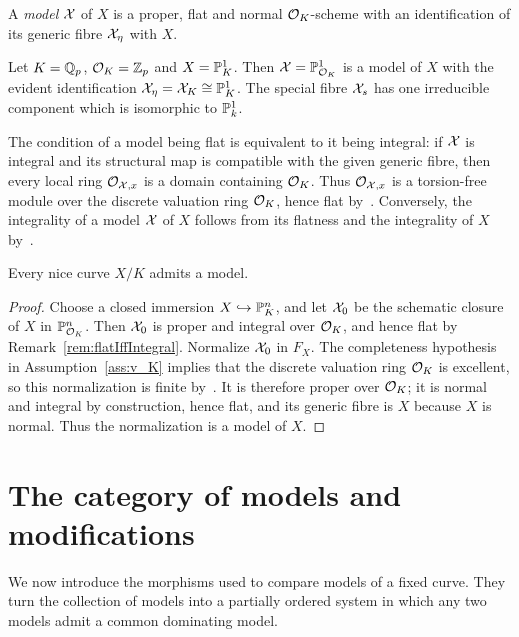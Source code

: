 \begin{definition} \label{def:model}
    A \textit{model} $\mathcal X$ of $X$ is a proper, flat and normal $\mathcal O_K $-scheme
    with an identification of its generic fibre $\mathcal X_\eta$ with $X$.
\end{definition}


\begin{example}
    Let $K = \mathbb Q_p$, $\mathcal O_K  = \mathbb Z_p$ and $X = \mathbb P^1_K$.
    Then $\mathcal X = \mathbb P^1_{\mathcal O_K}$ is a model of $X$ with the evident identification
    $\mathcal X_\eta = \mathcal X_K \cong \mathbb P^1_K$.
    The special fibre $\mathcal X_s$ has one irreducible component which is isomorphic to $\mathbb P^1_k$.
\end{example}

\begin{remark} \label{rem:flatIffIntegral}
    The condition of a model being flat is equivalent to it being integral:
    if $\mathcal X$ is integral and its structural map is compatible with the given generic fibre, then every local ring $\mathcal{O}_{\mathcal X,x}$ is a domain containing $\mathcal O_K$.
    Thus $\mathcal{O}_{\mathcal X,x}$ is a torsion-free module over the discrete valuation ring $\mathcal O_K$, hence flat by~\cite[Corollary 1.2.14]{Liu}.
    Conversely, the integrality of a model $\mathcal X$ of $X$ follows from its flatness and the integrality of $X$ by~\cite[Proposition 4.3.8]{Liu}.
\end{remark}

\begin{proposition}\label{prop:existence-of-models}
    Every nice curve $X/K$ admits a model.
\end{proposition}

\begin{proof}
    Choose a closed immersion $X\hookrightarrow\mathbb P^n_K$, and let $\mathcal X_0$ be the schematic closure of $X$ in $\mathbb P^n_{\mathcal O_K}$.
    Then $\mathcal X_0$ is proper and integral over $\mathcal O_K$, and hence flat by Remark~\ref{rem:flatIffIntegral}.
    Normalize $\mathcal X_0$ in $F_X$.
    The completeness hypothesis in Assumption~\ref{ass:v_K} implies that the discrete valuation ring $\mathcal O_K$ is excellent, so this normalization is finite by~\cite[Theorem 8.2.39(d)]{Liu}.
    It is therefore proper over $\mathcal O_K$; it is normal and integral by construction, hence flat, and its generic fibre is $X$ because $X$ is normal.
    Thus the normalization is a model of $X$.
\end{proof}


\section{The category of models and modifications}\label{sec:category-of-models-and-modifications}
We now introduce the morphisms used to compare models of a fixed curve.
They turn the collection of models into a partially ordered system in which any two models admit a common dominating model.

